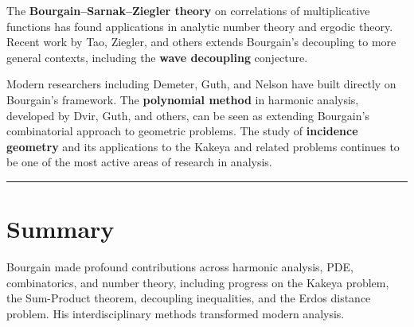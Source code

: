 The \textbf{Bourgain--Sarnak--Ziegler theory} on correlations of
multiplicative functions has found applications in analytic number
theory and ergodic theory.  Recent work by Tao, Ziegler, and others
extends Bourgain's decoupling to more general contexts, including
the \textbf{wave decoupling} conjecture.

Modern researchers including Demeter, Guth, and Nelson have built
directly on Bourgain's framework.  The \textbf{polynomial method}
in harmonic analysis, developed by Dvir, Guth, and others, can be
seen as extending Bourgain's combinatorial approach to geometric
problems.  The study of \textbf{incidence geometry} and its
applications to the Kakeya and related problems continues to be one
of the most active areas of research in analysis.

\begin{center}\rule{0.5\linewidth}{0.5pt}\end{center}

\section*{Summary}

Bourgain made profound contributions across harmonic analysis, PDE,
combinatorics, and number theory, including progress on the Kakeya
problem, the Sum-Product theorem, decoupling inequalities, and the
Erdos distance problem.  His interdisciplinary methods transformed
modern analysis.

